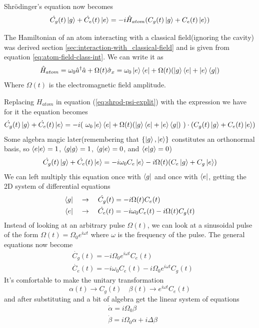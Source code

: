 \documentclass[english, a4paper, 12pt, twoside]{article}
\numberwithin{equation}{section} %
\begin{document}
Shr\"{o}dinger's equation now becomes
\begin{equation} \label{eq:shrod-psi-explit}
     \dot{C_g}(t) \ket{g} + \dot{C_e}(t) \ket{e} = -i \hat{H}_{atom} (C_g(t) \ket{g} + C_e(t) \ket{e})
\end{equation}

The Hamiltonian of an atom interacting with a classical field(ignoring the cavity) was derived section \ref{sec:interaction-with_classical-field} and is given from equation \ref{eq:atom-field-class-int}. We can write it as
\[
    \hat{H}_{atom} = \omega_0 \hat{a}^\dag \hat{a} + \Omega(t)\hat{\sigma}_x= \omega_0\ket{e}\bra{e} + \Omega(t)(\ket{g}\bra{e} + \ket{e}\bra{g})
\]
Where $\Omega(t)$ is the electromagnetic field amplitude.

Replacing $H_{atom}$ in equation (\ref{eq:shrod-psi-explit}) with the expression we have for it the equation becomes
\[
    \dot{C_g}(t) \ket{g} + \dot{C_e}(t) \ket{e} = -i (\ \omega_0\ket{e}\bra{e} + \Omega(t)(\ket{g}\bra{e} + \ket{e}\bra{g})\ )\cdot (C_g(t) \ket{g} + C_e(t) \ket{e})
\]
Some algebra magic later(remembering that $\{\ket{g},\ket{e}\}$ constitutes an orthonormal basis, so $\braket{e}{e} = 1$, $\braket{g}{g} = 1$, $\braket{g}{e} = 0$, and $\braket{e}{g} = 0$)
\[
    \dot{C_g}(t) \ket{g} + \dot{C_e}(t) \ket{e} = -i \omega_0 C_e \ket{e} - i\Omega(t)(C_e\ket{g} + C_g \ket{e})
\]
We can left multiply this equation once with $\bra{g}$ and once with $\bra{e}$, getting the 2D system of differential equations
\begin{align*}
    \bra{g} \quad &\rightarrow \quad \dot{C_g}(t) = -i \Omega(t)C_e(t) \\
    \bra{e} \quad &\rightarrow \quad \dot{C_e}(t) = -i \omega_0 C_e(t) - i\Omega(t) C_g(t)
\end{align*} 
Instead of looking at an arbitrary pulse $\Omega (t)$, we can look at a sinusoidal pulse of the form $\Omega (t) = \Omega_0 e^{i\omega t}$ where $\omega$ is the frequency of the pulse. The general equations now become
\begin{align*}
    &\dot{C_g}(t) = -i \Omega_0 e^{i\omega t}C_e(t) \\
    &\dot{C_e}(t) = -i \omega_0 C_e(t) - i \Omega_0 e^{i\omega t} C_g(t)
\end{align*}
It's comfortable to make the unitary transformation
\[
    \alpha(t) \rightarrow C_g(t) \quad \beta(t) \rightarrow e^{i \omega t} C_e(t)
\]
and after substituting and a bit of algebra get the linear system of equations
\begin{align*}
    &\dot{\alpha} = i \Omega_0 \beta \\
    &\dot{\beta} = i \Omega_0 \alpha + i \Delta \beta
\end{align*}
\end{document}
